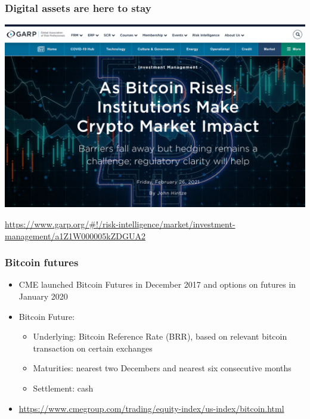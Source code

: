 \documentclass[10pt,mathserif]{beamer}
\renewcommand{\(}{\begin{columns}}
\renewcommand{\)}{\end{columns}}
\newcommand{\<}[1]{\begin{column}{#1}}
\renewcommand{\>}{\end{column}}
\theoremstyle{definition}
\begin{document}
\begin{frame}
  \frametitle{Digital assets are here to stay}
  \begin{center}
    \includegraphics[scale=.25]{../_pics/ScreenshotGARP.pdf}
  \end{center}
  {\tiny \url{https://www.garp.org/\#!/risk-intelligence/market/investment-management/a1Z1W000005kZDGUA2}}
\end{frame}

\begin{frame}
  \frametitle{Bitcoin futures}
  \begin{itemize}
    \addtolength{\itemsep}{3pt}
  \item CME launched Bitcoin Futures in December 2017 and options on
    futures in January 2020
  \item Bitcoin Future:
    \begin{itemize}
    \item Underlying: Bitcoin Reference Rate (BRR), based on relevant
      bitcoin transaction on certain exchanges
    \item Maturities: nearest two Decembers and nearest six consecutive
      months 
      \item Settlement: cash
    \end{itemize}
    \item {\footnotesize \url{https://www.cmegroup.com/trading/equity-index/us-index/bitcoin.html}}
  \end{itemize}
\end{frame}
\end{document}
